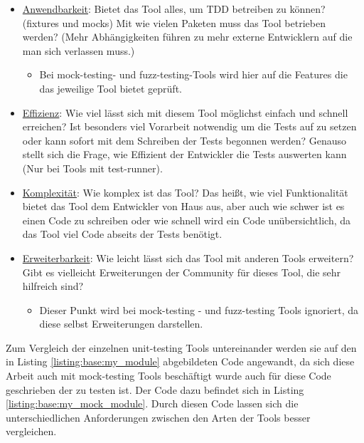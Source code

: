 \begin{itemize}
    \item \underline{Anwendbarkeit}:\newline
    Bietet das Tool alles, um TDD betreiben zu können? (\Glspl{fixture} und \Glspl{mock})
    Mit wie vielen Paketen muss das Tool betrieben werden? (Mehr Abhängigkeiten führen zu
    mehr externe Entwicklern auf die man sich verlassen muss.)
    \begin{itemize}
        \item Bei \gls{mock}-testing- und \gls{fuzz}-testing-Tools wird hier auf die
        Features die das jeweilige Tool bietet geprüft.
    \end{itemize}
    
    \item \underline{Effizienz}:\newline
    Wie viel lässt sich mit diesem Tool möglichst einfach und
    schnell erreichen? Ist besonders viel Vorarbeit notwendig um die Tests
    auf zu setzen oder kann sofort mit dem Schreiben der Tests begonnen
    werden?
    \newline
    Genauso stellt sich die Frage, wie Effizient der Entwickler die Tests
    auswerten kann (Nur bei Tools mit test-runner).
    
    \item \underline{Komplexität}:\newline
    Wie komplex ist das Tool? Das heißt, wie viel Funktionalität
    bietet das Tool dem Entwickler von Haus aus, aber auch wie schwer
    ist es einen Code zu schreiben oder wie schnell wird ein Code unübersichtlich, da
    das Tool viel Code abseits der Tests benötigt.
    
    \item \underline{Erweiterbarkeit}:\newline
    Wie leicht lässt sich das Tool mit anderen Tools erweitern?
    Gibt es vielleicht Erweiterungen der Community für dieses Tool, die sehr
    hilfreich sind?
    \begin{itemize}
        \item Dieser Punkt wird bei \gls{mock}-testing - und \gls{fuzz}-testing Tools ignoriert,
        da diese selbst Erweiterungen darstellen.
    \end{itemize}
\end{itemize}
\noindent
Zum Vergleich der einzelnen unit-testing Tools untereinander werden sie auf den in Listing
\ref{listing:base:my_module} abgebildeten Code angewandt, da sich diese Arbeit auch mit
\gls{mock}-testing Tools beschäftigt wurde auch für diese Code geschrieben der zu testen ist.
Der Code dazu befindet sich in Listing \ref{listing:base:my_mock_module}. Durch diesen Code
lassen sich die unterschiedlichen Anforderungen zwischen den Arten der Tools besser vergleichen.

